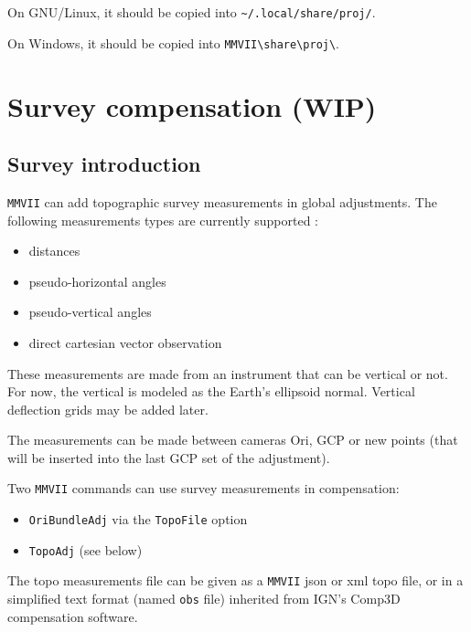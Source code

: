 On GNU/Linux, it should be copied into {\tt \textasciitilde /.local/share/proj/}.

On Windows, it should be copied into {\tt MMVII\textbackslash share\textbackslash proj\textbackslash}.




\chapter{Survey compensation (WIP)}
\label{Chap:TopoUser}


\section{Survey introduction}

{\tt MMVII} can add topographic survey measurements in global adjustments.
The following measurements types are currently supported :

\begin{itemize}
    \item distances
    \item pseudo-horizontal angles
    \item pseudo-vertical angles
    \item direct cartesian vector observation
\end{itemize}

These measurements are made from an instrument that can be vertical or not.
For now, the vertical is modeled as the Earth's ellipsoid normal. Vertical deflection grids may be added later.

The measurements can be made between cameras Ori, GCP or new points (that will be inserted into the last GCP set of the adjustment).

Two {\tt MMVII} commands can use survey measurements in compensation:
\begin{itemize}
    \item {\tt OriBundleAdj} via the {\tt TopoFile} option
    \item {\tt TopoAdj} (see below)
\end{itemize}

The topo measurements file can be given as a {\tt MMVII} json or xml topo file, or in a simplified text format (named {\tt obs} file) inherited from IGN's Comp3D compensation software.

